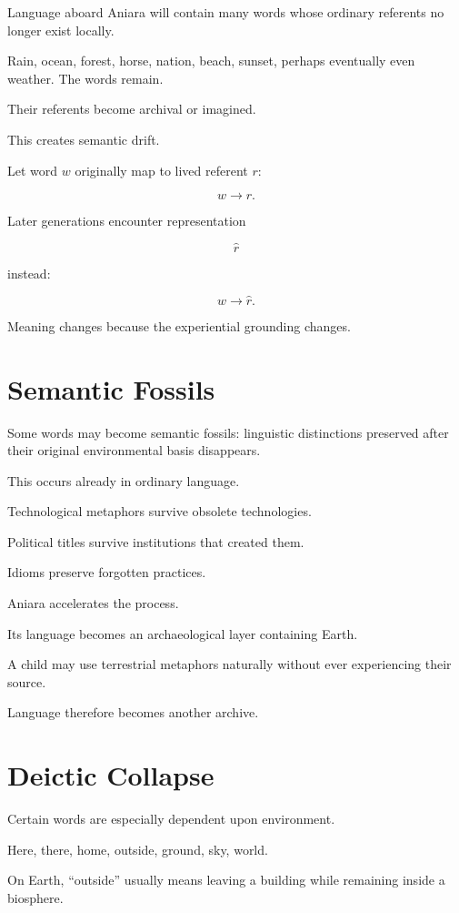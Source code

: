 \documentclass[11pt,oneside]{book}
\theoremstyle{definition}
\theoremstyle{remark}
\begin{document}
Language aboard Aniara will contain many words whose ordinary referents no longer exist locally.

Rain, ocean, forest, horse, nation, beach, sunset, perhaps eventually even weather. The words remain.

Their referents become archival or imagined.

This creates semantic drift.

Let word \(w\) originally map to lived referent \(r\):

\[
w\rightarrow r.
\]

Later generations encounter representation

\[
\hat r
\]

instead:

\[
w\rightarrow\hat r.
\]

Meaning changes because the experiential grounding changes.

\section{Semantic Fossils}

Some words may become semantic fossils: linguistic distinctions preserved after their original environmental basis disappears.

This occurs already in ordinary language.

Technological metaphors survive obsolete technologies.

Political titles survive institutions that created them.

Idioms preserve forgotten practices.

Aniara accelerates the process.

Its language becomes an archaeological layer containing Earth.

A child may use terrestrial metaphors naturally without ever experiencing their source.

Language therefore becomes another archive.

\section{Deictic Collapse}

Certain words are especially dependent upon environment.

Here, there, home, outside, ground, sky, world.

On Earth, ``outside'' usually means leaving a building while remaining inside a biosphere.
\end{document}
